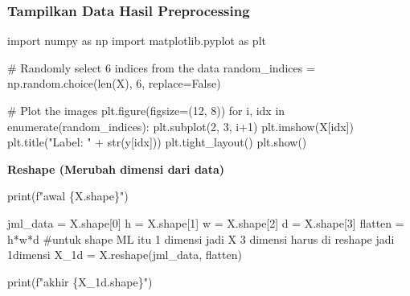 \documentclass[
  letterpaper,
  DIV=11,
  numbers=noendperiod]{scrreprt}
\newenvironment{Shaded}{\begin{snugshade}}{\end{snugshade}}
\newcommand{\BuiltInTok}[1]{\textcolor[rgb]{0.00,0.23,0.31}{#1}}
\newcommand{\CommentTok}[1]{\textcolor[rgb]{0.37,0.37,0.37}{#1}}
\newcommand{\ControlFlowTok}[1]{\textcolor[rgb]{0.00,0.23,0.31}{#1}}
\newcommand{\DecValTok}[1]{\textcolor[rgb]{0.68,0.00,0.00}{#1}}
\newcommand{\ImportTok}[1]{\textcolor[rgb]{0.00,0.46,0.62}{#1}}
\newcommand{\KeywordTok}[1]{\textcolor[rgb]{0.00,0.23,0.31}{#1}}
\newcommand{\NormalTok}[1]{\textcolor[rgb]{0.00,0.23,0.31}{#1}}
\newcommand{\OperatorTok}[1]{\textcolor[rgb]{0.37,0.37,0.37}{#1}}
\newcommand{\SpecialCharTok}[1]{\textcolor[rgb]{0.37,0.37,0.37}{#1}}
\newcommand{\SpecialStringTok}[1]{\textcolor[rgb]{0.13,0.47,0.30}{#1}}
\newcommand{\StringTok}[1]{\textcolor[rgb]{0.13,0.47,0.30}{#1}}
\newcommand{\VariableTok}[1]{\textcolor[rgb]{0.07,0.07,0.07}{#1}}
\begin{document}
\hypertarget{tampilkan-data-hasil-preprocessing-1}{%
\subsubsection*{Tampilkan Data Hasil
Preprocessing}\label{tampilkan-data-hasil-preprocessing-1}}

\begin{Shaded}
\begin{Highlighting}[]
\ImportTok{import}\NormalTok{ numpy }\ImportTok{as}\NormalTok{ np}
\ImportTok{import}\NormalTok{ matplotlib.pyplot }\ImportTok{as}\NormalTok{ plt}

\CommentTok{\# Randomly select 6 indices from the data}
\NormalTok{random\_indices }\OperatorTok{=}\NormalTok{ np.random.choice(}\BuiltInTok{len}\NormalTok{(X), }\DecValTok{6}\NormalTok{, replace}\OperatorTok{=}\VariableTok{False}\NormalTok{)}

\CommentTok{\# Plot the images}
\NormalTok{plt.figure(figsize}\OperatorTok{=}\NormalTok{(}\DecValTok{12}\NormalTok{, }\DecValTok{8}\NormalTok{))}
\ControlFlowTok{for}\NormalTok{ i, idx }\KeywordTok{in} \BuiltInTok{enumerate}\NormalTok{(random\_indices):}
\NormalTok{    plt.subplot(}\DecValTok{2}\NormalTok{, }\DecValTok{3}\NormalTok{, i}\OperatorTok{+}\DecValTok{1}\NormalTok{)}
\NormalTok{    plt.imshow(X[idx])}
\NormalTok{    plt.title(}\StringTok{"Label: "} \OperatorTok{+} \BuiltInTok{str}\NormalTok{(y[idx]))}
\NormalTok{plt.tight\_layout()}
\NormalTok{plt.show()}
\end{Highlighting}
\end{Shaded}

\textbf{Reshape (Merubah dimensi dari data)}

\begin{Shaded}
\begin{Highlighting}[]
\BuiltInTok{print}\NormalTok{(}\SpecialStringTok{f"awal }\SpecialCharTok{\{}\NormalTok{X}\SpecialCharTok{.}\NormalTok{shape}\SpecialCharTok{\}}\SpecialStringTok{"}\NormalTok{)}

\NormalTok{jml\_data }\OperatorTok{=}\NormalTok{ X.shape[}\DecValTok{0}\NormalTok{]}
\NormalTok{h }\OperatorTok{=}\NormalTok{ X.shape[}\DecValTok{1}\NormalTok{]}
\NormalTok{w }\OperatorTok{=}\NormalTok{ X.shape[}\DecValTok{2}\NormalTok{]}
\NormalTok{d }\OperatorTok{=}\NormalTok{ X.shape[}\DecValTok{3}\NormalTok{]}
\NormalTok{flatten  }\OperatorTok{=}\NormalTok{ h}\OperatorTok{*}\NormalTok{w}\OperatorTok{*}\NormalTok{d}
\CommentTok{\#untuk shape ML itu 1 dimensi jadi X 3 dimensi harus di reshape jadi 1dimensi}
\NormalTok{X\_1d }\OperatorTok{=}\NormalTok{ X.reshape(jml\_data, flatten)}

\BuiltInTok{print}\NormalTok{(}\SpecialStringTok{f"akhir }\SpecialCharTok{\{}\NormalTok{X\_1d}\SpecialCharTok{.}\NormalTok{shape}\SpecialCharTok{\}}\SpecialStringTok{"}\NormalTok{)  }
\end{Highlighting}
\end{Shaded}
\end{document}
